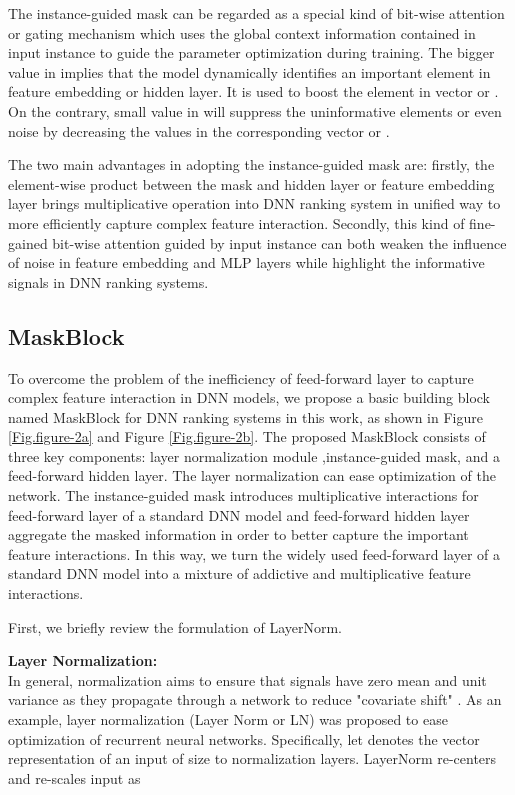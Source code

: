 \documentclass[sigconf]{acmart}
\begin{document}
The instance-guided mask can be regarded as a special kind of bit-wise attention or gating mechanism which uses the global context information contained in input instance to guide the parameter optimization during training. The bigger value in  implies that the model dynamically identifies an important element in feature embedding or hidden layer. It is used to boost the element in vector  or . On the contrary, small value in  will suppress the uninformative elements or even noise by decreasing the values in the corresponding vector  or .



The two main advantages in adopting the instance-guided mask are: firstly, the element-wise product between the mask and hidden layer or feature embedding layer brings multiplicative operation into DNN ranking system in unified way to more efficiently capture complex feature interaction. Secondly, this kind of fine-gained bit-wise attention guided by input instance can both weaken the influence of noise in feature embedding and MLP layers while highlight the informative signals in DNN ranking systems.






\subsection{MaskBlock}
To overcome the problem of the inefficiency of feed-forward layer to capture complex feature interaction in DNN models, we propose a basic building block named MaskBlock for DNN ranking systems in this work, as shown in Figure \ref{Fig.figure-2a} and Figure \ref{Fig.figure-2b}. The proposed MaskBlock  consists of three key components: layer normalization module ,instance-guided mask, and a feed-forward hidden layer. The layer normalization can ease optimization of the network. The instance-guided mask introduces multiplicative interactions for feed-forward layer of a standard DNN model and feed-forward hidden layer aggregate the masked information in order to better capture the important feature interactions. In this way, we turn the widely used feed-forward layer of a standard DNN model into a mixture of addictive and multiplicative feature interactions.

First, we briefly review the formulation of LayerNorm.

\noindent\textbf{Layer Normalization:}\\
\noindent In general, normalization aims to ensure that signals have zero mean and unit variance as they propagate through a network to reduce "covariate shift" \cite{ioffe2015batch}. As an example, layer normalization (Layer Norm or LN)\cite{ba2016layer} was proposed to ease optimization of recurrent neural networks. Specifically, let  denotes the vector representation of an input of size  to normalization layers. LayerNorm re-centers and re-scales input  as
\end{document}
